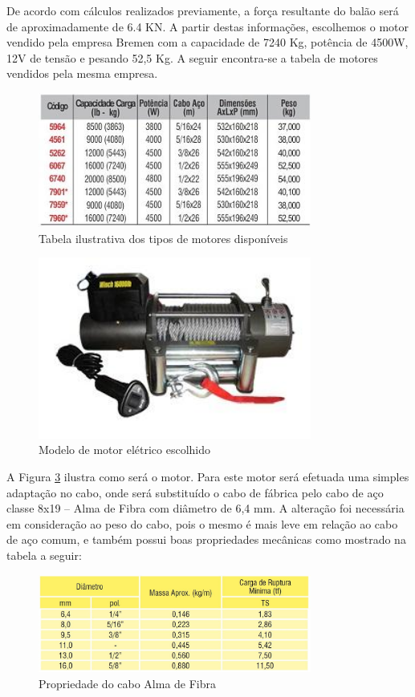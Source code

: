 De acordo com cálculos realizados previamente, a força resultante do balão será de aproximadamente de 6.4 KN. A partir destas informações, escolhemos o motor vendido pela empresa Bremen com a capacidade de 7240 Kg, potência de 4500W, 12V de tensão e pesando 52,5 Kg. A seguir encontra-se a tabela de motores vendidos pela mesma empresa.

\begin{figure}[H]
	\centering
	\includegraphics[width=0.8\textwidth]{figuras/tabelamotor}
	\caption[Tabela ilustrativa dos tipos de motores disponíveis]{Tabela ilustrativa dos tipos de motores disponíveis~\cite{bremem}}
	\label{img:tabelamotor}
\end{figure}

\begin{figure}[H]
	\centering
	\includegraphics[width=0.8\textwidth]{figuras/modelodemotoreletrico}
	\caption[Modelo de motor elétrico escolhido]{Modelo de motor elétrico escolhido~\cite{bremem}}
	\label{img:motorescolhido}
\end{figure}

A Figura \ref{img:motorescolhido} ilustra como será o motor. Para este motor será efetuada uma simples adaptação no cabo, onde será substituído o cabo de fábrica pelo cabo de aço classe 8x19 – Alma de Fibra com diâmetro de 6,4 mm. A alteração foi necessária em consideração ao peso do cabo, pois o mesmo é mais leve em relação ao cabo de aço comum, e também possui boas propriedades mecânicas como mostrado na tabela a seguir:

\begin{figure}[H]
	\centering
	\includegraphics[width=0.8\textwidth]{figuras/tabelacabo}
	\caption[Propriedade do cabo Alma de Fibra]{Propriedade do cabo Alma de Fibra~\cite{acrocabo}}
	\label{img:motorescolhido}
\end{figure}
